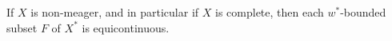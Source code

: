 If $X$ is non-meager, and in particular if $X$ is complete, then each $w^*$-bounded subset $F$ of $X^*$ is equicontinuous.
